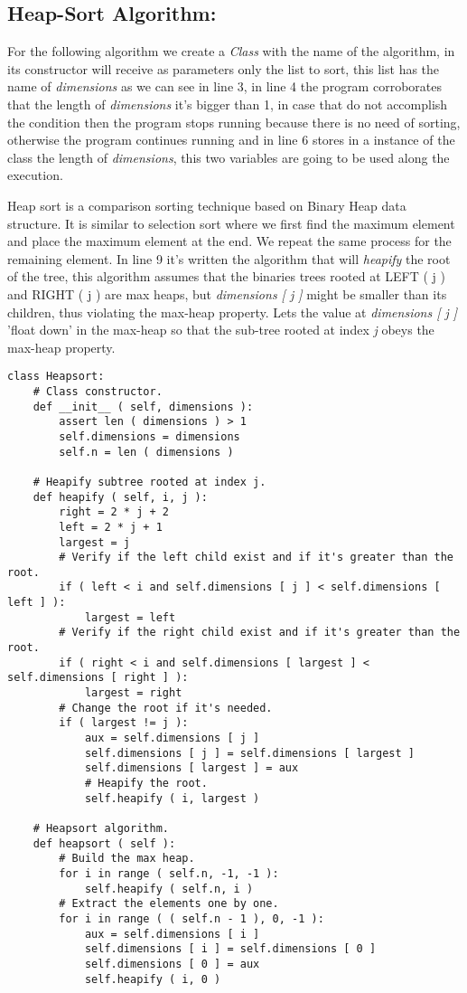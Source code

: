\subsection{Heap-Sort Algorithm:}

For the following algorithm we create a {\itshape Class} with the name of the algorithm, in its constructor will receive as parameters only the list to sort, this list has the name of {\itshape dimensions} as we can see in line 3, in line 4 the program corroborates that the length of {\itshape dimensions} it's bigger than 1, in case that do not accomplish the condition then the program stops running because there is no need of sorting, otherwise the program continues running and in line 6 stores in a instance of the class the length of {\itshape dimensions}, this two variables are going to be used along the execution. \hfill \break

Heap sort is a comparison sorting technique based on Binary Heap data structure. It is similar to selection sort where we first find the maximum element and place the maximum element at the end. We repeat the same process for the remaining element. In line 9 it's written the algorithm that will {\itshape heapify} the root of the tree, this algorithm assumes that the binaries trees rooted at LEFT ( j ) and RIGHT ( j ) are max heaps, but {\itshape dimensions [ j ]} might be smaller than its children, thus violating the max-heap property. Lets the value at {\itshape dimensions [ j ]} 'float down' in the max-heap so that the sub-tree rooted at index {\itshape j} obeys the max-heap property. \hfill \break

\begin{lstlisting}
class Heapsort:
    # Class constructor.
    def __init__ ( self, dimensions ):
        assert len ( dimensions ) > 1
        self.dimensions = dimensions
        self.n = len ( dimensions )

    # Heapify subtree rooted at index j.
    def heapify ( self, i, j ):
        right = 2 * j + 2
        left = 2 * j + 1
        largest = j
        # Verify if the left child exist and if it's greater than the root.
        if ( left < i and self.dimensions [ j ] < self.dimensions [ left ] ):
            largest = left
        # Verify if the right child exist and if it's greater than the root.
        if ( right < i and self.dimensions [ largest ] < self.dimensions [ right ] ):
            largest = right
        # Change the root if it's needed.
        if ( largest != j ):
            aux = self.dimensions [ j ]
            self.dimensions [ j ] = self.dimensions [ largest ]
            self.dimensions [ largest ] = aux
            # Heapify the root.
            self.heapify ( i, largest )

    # Heapsort algorithm.
    def heapsort ( self ):
        # Build the max heap.
        for i in range ( self.n, -1, -1 ):
            self.heapify ( self.n, i )
        # Extract the elements one by one.
        for i in range ( ( self.n - 1 ), 0, -1 ):
            aux = self.dimensions [ i ]
            self.dimensions [ i ] = self.dimensions [ 0 ]
            self.dimensions [ 0 ] = aux
            self.heapify ( i, 0 )
\end{lstlisting} \hfill \break

